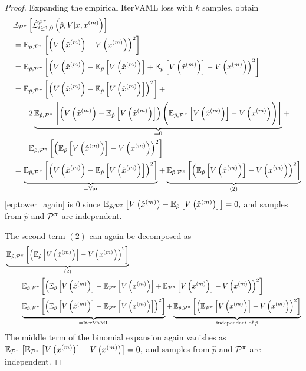 \begin{proof}
Expanding the empirical IterVAML loss with $k$ samples, obtain
\begin{align}
   & \EEX{\P^\pi}{\hat{\mathcal{L}}^{\P^\pi}_{i\geq1,0}\left(\hat{p},V|x,x^{(m)}\right)} \\
   \quad & =  \EEX{\hat{p},\P^\pi}{\left(\muV{m} - V\left(x^{(m)}\right)\right)^2} \\
   \quad & =  \EEX{\hat{p},\P^\pi}{\left(\muV{m} - \EEX{\hat{p}}{\muV{m}} + \EEX{\hat{p}}{\muV{m}} - V\left(x^{(m)}\right)\right)^2} \\
   \quad & =  \EEX{\hat{p},\P^\pi}{\left(\muV{m} - \EEX{\hat{p}}{V\left(\hat{x}^{(m)}\right)}\right)^2} + \\ 
   \quad &  \quad \quad  2 \underbrace{\EEX{\hat{p},\P^\pi}{\roundb{\muV{m} - \EEX{\hat{p}}{V\left(\hat{x}^{(m)}\right)}}\Biggl(\EEX{\hat{p},\P^\pi}{V\left(\hat{x}^{(m)}\right)} - V\left(x^{(m)}\right)\Biggr)}}_{=0} + \label{eq:tower_again}\\
   \quad &  \quad \quad  \EEX{\hat{p},\P^\pi}{\left(\EEX{\hat{p}}{V\left(\hat{x}^{(m)}\right)} - V\left(x^{(m)}\right)\right)^2}\\
   \quad & =  \underbrace{\EEX{\hat{p},\P^\pi}{\left(V\left(\hat{x}^{(m)}\right) - \EEX{\hat{p}}{V\left(\hat{x}^{(m)}\right)}\right)^2}}_{= \mathrm{Var}} + \underbrace{\EEX{\hat{p},\P^\pi}{\left(\EEX{\hat{p}}{V\left(\hat{x}^{(m)}\right)} - V\left(x^{(m)}\right)\right)^2}}_{(2)}
\end{align}
\autoref{eq:tower_again} is $0$ since $\EEX{\hat{p},\P^\pi}{\muV{m} - \EEX{\hat{p}}{V\left(\hat{x}^{(m)}\right)}} = 0,$ and samples from $\hat{p}$ and $\P^\pi$ are independent.

The second term $(2)$ can again be decomposed as
\begin{align}
   &\underbrace{\EEX{\hat{p},\P^\pi}{\left(\EEX{\hat{p}}{V\left(\hat{x}^{(m)}\right)} - V\left(x^{(m)}\right)\right)^2}}_{(2)} \\
   &\quad=\EEX{\hat{p},\P^\pi}{\left(\EEX{\hat{p}}{V\left(\hat{x}^{(m)}\right)} - \EEX{\P^\pi}{V\left(x^{(m)}\right)} + \EEX{\P^\pi}{V\left(x^{(m)}\right)} - V\left(x^{(m)}\right)\right)^2} \\
   &\quad=\underbrace{\EEX{\hat{p},\P^\pi}{\left(\EEX{\hat{p}}{V\left(\hat{x}^{(m)}\right)} - \EEX{\P^\pi}{V\left(x^{(m)}\right)}\right)^2}}_{= \mathrm{IterVAML}} + \underbrace{\EEX{\hat{p},\P^\pi}{\left(\EEX{\P^\pi}{V\left(x^{(m)}\right)} - V\left(x^{(m)}\right)\right)^2}}_{\text{independent of }\hat{p}}
\end{align}
The middle term of the binomial expansion again vanishes as $\EEX{\P^\pi}{\EEX{\P^\pi}{V\left(x^{(m)}\right)} - V\left(x^{(m)}\right)} = 0,$ and samples from $\hat{p}$ and $\P^\pi$ are independent.


\end{proof}
